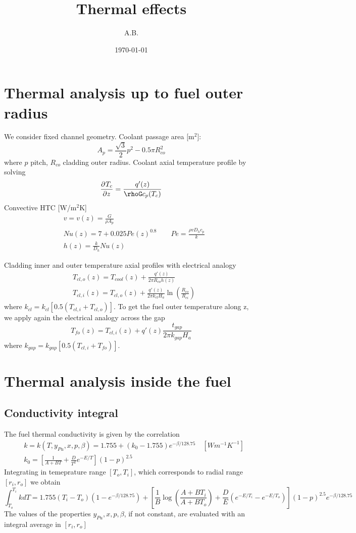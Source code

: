 \documentclass{article}
\title{Thermal effects}
\author{A.B.}
\date{\today}
\newcommand{\pderiv}[3][]{\frac{\partial^{#1} #2}{\partial #3^{#1}}}
\begin{document}
\maketitle

\section{Thermal analysis up to fuel outer radius}
We consider fixed channel geometry. Coolant passage area [m$^2$]:
\[
  A_p = \frac{\sqrt{3}}{2}p^2 - 0.5\pi R_{co}^2
\]
where $p$ pitch, $R_{co}$ cladding outer radius.
Coolant axial temperature profile by solving
\[ 
  \pderiv{T_c}{z} = \frac{q'(z)}{\rhoG c_p(T_c) }
\]
Convective HTC [W/m$^2$K]
\begin{align*}
  & v = v(z) = \frac{G}{\rho A_p} \\
  & Nu(z) = 7 + 0.025Pe(z)^{0.8} \qquad Pe = \frac{\rho v D_h c_p}{k}\\
  & h(z) = \frac{k}{D_h}Nu(z)
\end{align*}

Cladding inner and outer temperature axial profiles with electrical analogy
\begin{align*}
  & T_{cl,o}(z) = T_{cool}(z) + \frac{q'(z)}{2\pi R_{co}h(z)}\\
  & T_{cl,i}(z) = T_{cl,o}(z) + \frac{q'(z)}{2\pi k_{cl}H_a}\ln\left(\frac{R_{co}}{R_{ci}}\right)
\end{align*}
where $k_{cl} = k_{cl}[0.5(T_{cl,i} + T_{cl,o})]$. To get the fuel outer temperature along z, we apply again the electrical analogy across the gap
\[
  T_{fo}(z) = T_{cl,i}(z) + q'(z)\frac{t_{gap}}{2\pi k_{gap}H_a}
\]
where $k_{gap} = k_{gap}[0.5(T_{cl,i} + T_{fo})]$. 

\section{Thermal analysis inside the fuel}
\subsection{Conductivity integral}
The fuel thermal conductivity is given by the correlation 
\begin{align*}
  & k = k(T, y_{Pu}, x, p, \beta) =  1.755 + (k_0 - 1.755)e^{-\beta/128.75} \quad [W m^{-1} K^{-1}]\\
  & k_0 = \left[\frac{1}{A + BT} + \frac{D}{T^2}e^{-E/T} \right](1 - p)^{2.5}
\end{align*}
Integrating in temeprature range \([T_o, T_i]\), which corresponds to radial range \([r_i,r_o]\) we obtain
\[
  \int_{T_o}^{T_i} k dT = 1.755(T_i -  T_o)(1 - e^{-\beta/128.75}) + \left[ \frac{1}{B}\log\left(\frac{A + BT_i}{A + BT_o}\right) + \frac{D}{E}(e^{-E/T_i} - e^{-E/T_o})\right](1-p)^{2.5}e^{-\beta/128.75}
\]
The values of the properties \(y_{Pu}, x, p, \beta\), if not constant, are evaluated with an integral average in \([r_i,r_o]\)
\end{document}
